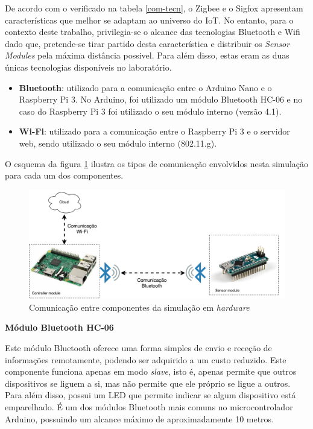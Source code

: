 De acordo com o verificado na tabela \ref{com-tecn}, o Zigbee e o Sigfox apresentam características que melhor se adaptam ao universo do \ac{IoT}. No entanto, para o contexto deste trabalho, privilegia-se o alcance das tecnologias Bluetooth e Wifi dado que, pretende-se tirar partido desta característica e distribuir os  \textit{Sensor Modules} pela máxima distância possivel. Para além disso, estas eram as duas únicas tecnologias disponíveis no laboratório.

\begin{itemize}
	\item \textbf{Bluetooth}: utilizado para a comunicação entre o Arduino Nano e o Raspberry Pi 3. No Arduino, foi utilizado um módulo Bluetooth HC-06 e no caso do Raspberry Pi 3 foi utilizado o seu módulo interno (versão 4.1). 
	\item \textbf{Wi-Fi}: utilizado para a comunicação entre o Raspberry Pi 3 e o servidor web, sendo utilizado o seu módulo interno (802.11.g). 
\end{itemize}


O esquema da figura \ref{esquemcomm} ilustra os tipos de comunicação envolvidos nesta simulação para cada um dos componentes. 

\begin{figure}[!htb]
	\centering
	\includegraphics[width=\linewidth]{img/comm-blue/HW-geral.pdf}
	\caption{Comunicação entre componentes da simulação em \textit{hardware}}
	\label{esquemcomm}
\end{figure}




\textbf{Módulo Bluetooth HC-06}



Este módulo Bluetooth oferece uma forma simples de envio e receção de informações remotamente, podendo ser adquirido a um custo reduzido. Este componente funciona apenas em modo \textit{slave}, isto é, apenas permite que outros dispositivos se liguem a si, mas não permite que ele próprio se ligue a outros. Para além disso, possui um \ac{LED} que permite indicar se algum dispositivo está emparelhado. É um dos módulos Bluetooth mais comuns no microcontrolador Arduino, possuindo um alcance máximo de aproximadamente 10 metros\cite{GuangzhouHCInformationTechnologyCo.2011}.


